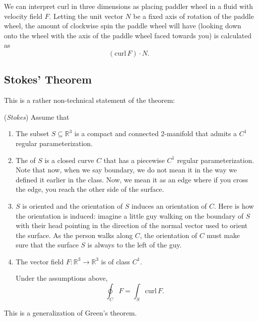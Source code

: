 \documentclass[11pt]{article}
\theoremstyle{definition}
\newcommand{\R}{\mathbb{R}}                      %
\begin{document}
We can interpret curl in three dimensions as placing paddler wheel in a fluid with velocity field $F$. Letting the unit vector $N$ be a fixed axis of rotation of the paddle wheel, the amount of clockwise spin the paddle wheel will have (looking down onto the wheel with the axis of the paddle wheel faced towards you) is calculated as
$$
(\mathrm{curl}\,F)\cdot N.
$$
\subsection{Stokes' Theorem}
This is a rather non-technical statement of the theorem:
\begin{shaded}
    \theorem (\textit{Stokes}) Assume that
    \begin{enumerate}
        \item The subset $S\subseteq \R^3$ is a compact and connected 2-manifold that admits a $C^1$ regular parameterization.
        \item The  of $S$ is a closed curve $C$ that has a piecewise $C^1$ regular parameterization. Note that now, when we say boundary, we do not mean it in the way we defined it earlier in the class. Now, we mean it as an edge where if you cross the edge, you reach the other side of the surface.
        \item $S$ is oriented and the orientation of $S$ induces an orientation of $C$. Here is how the orientation is induced: imagine a little guy walking on the boundary of $S$ with their head pointing in the direction of the normal vector used to orient the surface. As the person walks along $C$, the orientation of $C$ must make sure that the surface $S$ is always to the left of the guy.
        \item The vector field $F:\R^3\to \R^3$ is of class $C^1$.

        Under the assumptions above, 
        $$
        \oint_C F = \int_S \mathrm{curl}\, F.
        $$
    \end{enumerate}
\end{shaded}
\note This is a generalization of Green's theorem.
\end{document}
